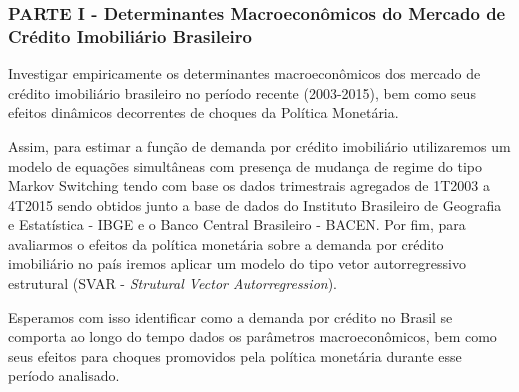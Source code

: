 \subsubsection*{PARTE I - Determinantes Macroeconômicos do Mercado de Crédito Imobiliário Brasileiro}

Investigar empiricamente os determinantes macroeconômicos dos mercado de crédito imobiliário brasileiro no período recente (2003-2015), bem como seus efeitos dinâmicos decorrentes de choques da Política Monetária.

Assim, para estimar a função de demanda por crédito imobiliário utilizaremos um modelo de equações simultâneas com presença de mudança de regime do tipo Markov Switching tendo com base os dados trimestrais agregados de 1T2003 a 4T2015 sendo obtidos junto a base de dados do Instituto Brasileiro de Geografia e Estatística - IBGE e o Banco Central Brasileiro - BACEN. Por fim, para avaliarmos o efeitos da política monetária sobre a demanda por crédito imobiliário no país iremos aplicar um modelo do tipo vetor autorregressivo estrutural (SVAR - \textit{Strutural Vector Autorregression}).  

Esperamos com isso identificar como a demanda por crédito no Brasil se comporta ao longo do tempo dados os parâmetros macroeconômicos, bem como seus efeitos para choques promovidos pela política monetária durante esse período analisado. 

